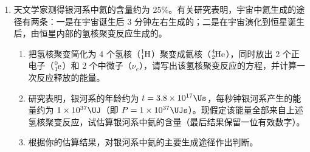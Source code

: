 \documentclass[\gkver]{gaokaozhenti}
\begin{document}
\begin{enumerate}
\begin{enumerate}
	\item
	两球从开始运动到相碰，A 球下落的高度。
	\item
	A、B 两球碰撞（碰撞时无机械能损失）后，各自速度的水平分量。
	\item
	轻绳拉直过程中，B 球受到绳子拉力的冲量大小。
\end{enumerate}




\item
天文学家测得银河系中氦的含量约为 $25\%$。有关研究表明，宇宙中氦生成的途径有两条：一是在宇宙诞生后 3 分钟左右生成的；二是在宇宙演化到恒星诞生后，由恒星内部的氢核聚变反应生成的。

\begin{enumerate}
	\item
	把氢核聚变简化为 4 个氢核（$\ce{^{1}_{1}H}$）聚变成氦核（$\ce{^{4}_{2}He}$），同时放出 2 个正电子（$\ce{^{0}_{1}e}$）和 2 个中微子（$\nu_{e}$），请写出该氢核聚变反应的方程，并计算一次反应释放的能量。
	\item
	研究表明，银河系的年龄约为 $t=3.8\times10^{17}\Us$，每秒钟银河系产生的能量约为 $1\times10^{37}\UJ$（即 $P=1\times10^{37}\UJs$）。现假定该能量全部来自上述氢核聚变反应，试估算银河系中氦的含量（最后结果保留一位有效数字）。
	\item
	根据你的估算结果，对银河系中氦的主要生成途径作出判断。
\end{enumerate}


\end{enumerate}
\end{document}
